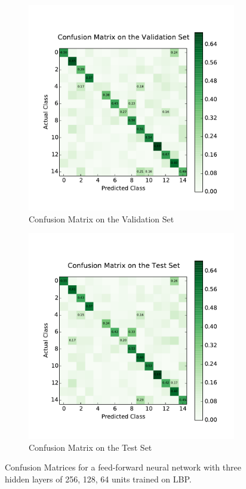 \begin{figure}
	\centering
	\begin{subfigure}[b]{0.45\linewidth}
		\centering
		\includegraphics[width=\linewidth]{images/2/cm_valid.pdf}
		\caption{Confusion Matrix on the Validation Set}
	\end{subfigure}
	\hfill
	\begin{subfigure}[b]{0.45\linewidth}
		\centering
		\includegraphics[width=\linewidth]{images/2/cm_test.pdf}
		\caption{Confusion Matrix on the Test Set}
	\end{subfigure}
	\caption{Confusion Matrices for a feed-forward neural network with three hidden layers of 256, 128, 64 units trained on LBP.}
	\label{shrine2_mat}
\end{figure}
